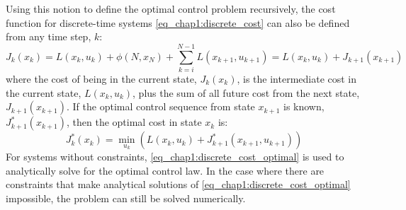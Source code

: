 
Using this notion to define the optimal control problem recursively, the cost function for discrete-time systems \eqref{eq_chap1:discrete_cost} can also be defined from any time step, $k$:
%
\begin{equation}
J_k(x_k) = L(x_k,u_k) + \phi(N,x_N)+\sum_{k=i}^{N-1}L(x_{k+1},u_{k+1}) = L(x_k,u_k) + J_{k+1}(x_{k+1})
\label{eq_chap1:discrete_cost_recursive}
\end{equation}
%
where the cost of being in the current state, $J_k(x_k)$, is the intermediate cost in the current state, $L(x_k,u_k)$, plus the sum of all future cost from the next state, $J_{k+1}(x_{k+1})$. If the optimal control sequence from state $x_{k+1}$ is known, $J^*_{k+1}(x_{k+1})$, then the optimal cost in state $x_k$ is:
%
\begin{equation}
J^*_k(x_k)= \min_{u_k}(L(x_k,u_k)+J^*_{k+1}(x_{k+1},u_{k+1}))
\label{eq_chap1:discrete_cost_optimal}
\end{equation}
For systems without constraints, \eqref{eq_chap1:discrete_cost_optimal} is used to analytically solve for the optimal control law.
%
In the case where there are constraints that make analytical solutions of \eqref{eq_chap1:discrete_cost_optimal} impossible, the problem can still be solved numerically.

